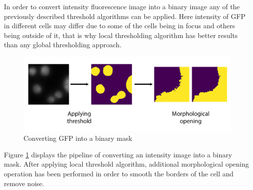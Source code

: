 In order to convert intensity fluorescence image into a binary image any of the previously described threshold algorithms can be applied. Here intensity of GFP in different cells may differ due to some of the cells being in focus and others being outside of it, that is why local thresholding algorithm has better results than any global thresholding approach.
\begin{figure}[H]
	\begin{center}
		\includegraphics[width=0.5\linewidth]{bilder/gfp/binary-bce/preprocessing/preprocessing-gfp.png}
		\caption{Converting GFP into a binary mask}\label{fig:gfp-binary}
	\end{center}
\end{figure}

Figure \ref{fig:gfp-binary} displays the pipeline of converting an intensity image into a binary mask. After applying local threshold algorithm, additional morphological opening operation has been performed in order to smooth the borders of the cell and remove noise. 